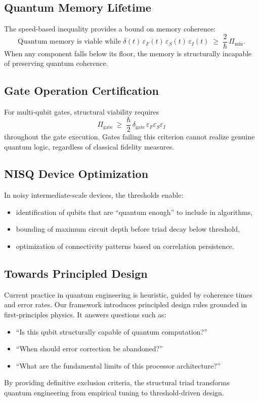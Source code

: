 \documentclass[10pt]{article}
\begin{document}
\subsection{Quantum Memory Lifetime}
The speed-based inequality provides a bound on memory coherence:
\begin{equation}
\text{Quantum memory is viable while }
\delta(t)\,\varepsilon_F(t)\,\varepsilon_S(t)\,\varepsilon_I(t) \;\geq\; \frac{2}{\hbar}\,\Pi_{\min}.
\end{equation}
When any component falls below its floor, the memory is structurally incapable of preserving
quantum coherence.

\subsection{Gate Operation Certification}
For multi-qubit gates, structural viability requires
\begin{equation}
\Pi_{\text{gate}} \;\geq\; \frac{\hbar}{2}\,\delta_{\text{gate}}\,
\varepsilon_F \varepsilon_S \varepsilon_I
\end{equation}
throughout the gate execution. Gates failing this criterion cannot realize genuine quantum logic,
regardless of classical fidelity measures.

\subsection{NISQ Device Optimization}
In noisy intermediate-scale devices, the thresholds enable:
\begin{itemize}
    \item identification of qubits that are ``quantum enough'' to include in algorithms,
    \item bounding of maximum circuit depth before triad decay below threshold,
    \item optimization of connectivity patterns based on correlation persistence.
\end{itemize}

\subsection{Towards Principled Design}
Current practice in quantum engineering is heuristic, guided by coherence times and error rates.
Our framework introduces principled design rules grounded in first-principles physics.
It answers questions such as:
\begin{itemize}
    \item ``Is this qubit structurally capable of quantum computation?''
    \item ``When should error correction be abandoned?''
    \item ``What are the fundamental limits of this processor architecture?''
\end{itemize}
By providing definitive exclusion criteria, the structural triad transforms quantum engineering
from empirical tuning to threshold-driven design.
\end{document}

